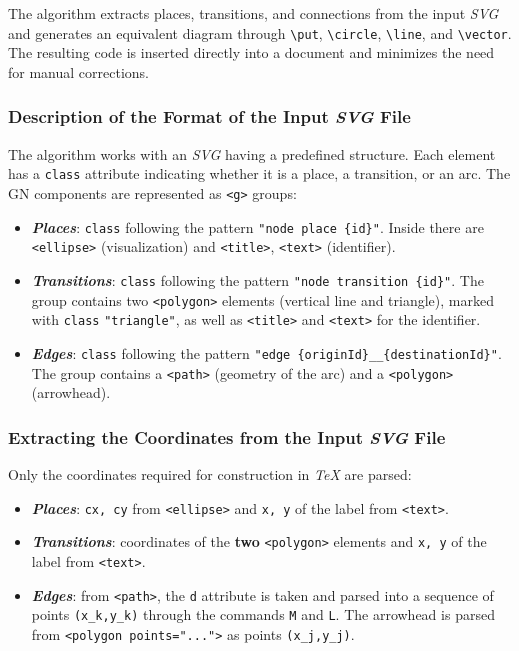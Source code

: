 The algorithm extracts places, transitions, and connections from the input \textit{SVG} and generates an equivalent diagram through \texttt{\textbackslash put}, \texttt{\textbackslash circle}, \texttt{\textbackslash line}, and \texttt{\textbackslash vector}. The resulting code is inserted directly into a document and minimizes the need for manual corrections.

\subsubsection{Description of the Format of the Input \textit{SVG} File}
\hspace*{2.5em}The algorithm works with an \textit{SVG} having a predefined structure. Each element has a \texttt{class} attribute indicating whether it is a place, a transition, or an arc. The GN components are represented as \texttt{<g>} groups:

\begin{itemize}
	\item \textbf{\textit{Places}}: \texttt{class} following the pattern \texttt{"node place \{id\}"}. Inside there are \texttt{<ellipse>} (visualization) and \texttt{<title>}, \texttt{<text>} (identifier).
	
	\item \textbf{\textit{Transitions}}: \texttt{class} following the pattern \texttt{"node transition \{id\}"}. The group contains two \texttt{<polygon>} elements (vertical line and triangle), marked with \texttt{class} \texttt{"triangle"}, as well as \texttt{<title>} and \texttt{<text>} for the identifier.
	
	\item \textbf{\textit{Edges}}: \texttt{class} following the pattern \texttt{"edge \{originId\}\_\_\{destinationId\}"}. The group contains a \texttt{<path>} (geometry of the arc) and a \texttt{<polygon>} (arrowhead).
\end{itemize}

\subsubsection{Extracting the Coordinates from the Input \textit{SVG} File}
\hspace*{2.5em}Only the coordinates required for construction in \textit{TeX} are parsed:

\begin{itemize}
	\item \textbf{\textit{Places}}: \texttt{cx, cy} from \texttt{<ellipse>} and \texttt{x, y} of the label from \texttt{<text>}.
	
	\item \textbf{\textit{Transitions}}: coordinates of the \textbf{two} \texttt{<polygon>} elements and \texttt{x, y} of the label from \texttt{<text>}.
	
	\item \textbf{\textit{Edges}}: from \texttt{<path>}, the \texttt{d} attribute is taken and parsed into a sequence of points \texttt{(x\_k,y\_k)} through the commands \texttt{M} and \texttt{L}. The arrowhead is parsed from \texttt{<polygon points="..."{}>} as points \texttt{(x\_j,y\_j)}.
\end{itemize}


